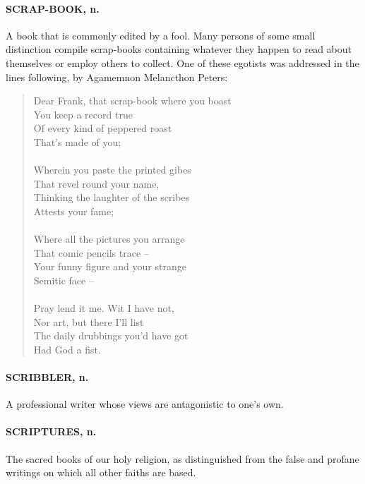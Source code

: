\documentclass[11pt]{article}
\begin{document}
\paragraph{SCRAP-BOOK, n.}  A book that is commonly edited by a fool.  Many
persons of some small distinction compile scrap-books containing
whatever they happen to read about themselves or employ others to
collect.  One of these egotists was addressed in the lines following,
by Agamemnon Melancthon Peters:

\begin{quote}   Dear Frank, that scrap-book where you boast \\
      You keep a record true \\
  Of every kind of peppered roast \\
          That's made of you; \\
 \\
  Wherein you paste the printed gibes \\
      That revel round your name, \\
  Thinking the laughter of the scribes \\
          Attests your fame; \\
 \\
  Where all the pictures you arrange \\
      That comic pencils trace -- \\
  Your funny figure and your strange \\
          Semitic face -- \\
 \\
  Pray lend it me.  Wit I have not, \\
      Nor art, but there I'll list \\
  The daily drubbings you'd have got \\
          Had God a fist.  \end{quote}

\paragraph{SCRIBBLER, n.}  A professional writer whose views are antagonistic to
one's own.

\paragraph{SCRIPTURES, n.}  The sacred books of our holy religion, as
distinguished from the false and profane writings on which all other
faiths are based.
\end{document}
